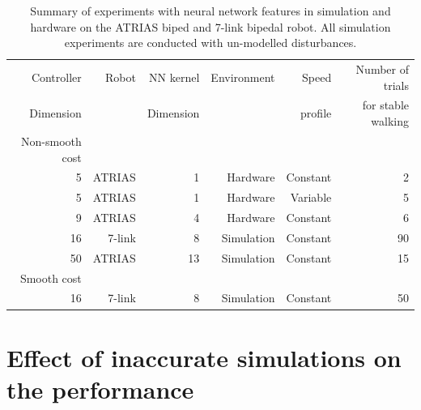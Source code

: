\begin{table}[h!]
\centering
{}
\small{
\begin{tabular}{@{}rrrrrr@{}} 
\toprule
Controller & Robot & NN kernel & Environment & Speed & Number of trials \\
Dimension &        & Dimension &              & profile & for stable walking \\

\midrule

Non-smooth cost \\

5 & ATRIAS & 1 & Hardware & Constant & 2 \\

5 & ATRIAS & 1 & Hardware & Variable & 5 \\

9 & ATRIAS & 4 & Hardware & Constant & 6 \\

16 & 7-link &8 & Simulation & Constant & 90 \\

50 & ATRIAS &13 & Simulation & Constant & 15 \\

Smooth cost \\

16 & 7-link & 8 & Simulation & Constant & 50 \\

\bottomrule
\end{tabular}
}
\caption{Summary of experiments with neural network features in simulation and hardware on the ATRIAS biped and 7-link bipedal robot. All simulation experiments are conducted with un-modelled disturbances.}
\label{tbl:nn_expts_details}
\end{table}

\pagebreak

\section{Effect of inaccurate simulations on the performance}

\label{subsec:mismatch_experiments}



